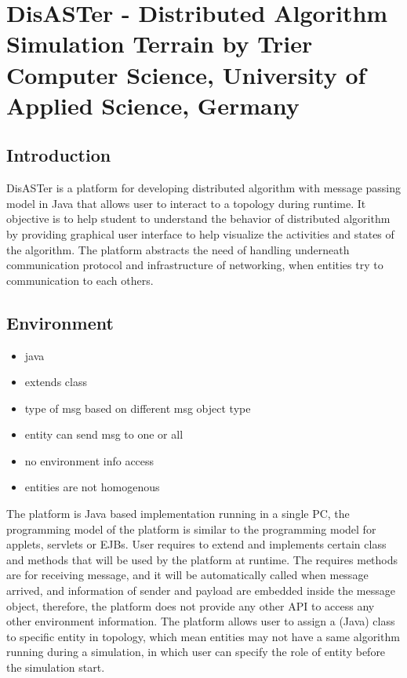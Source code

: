 \section{DisASTer - Distributed Algorithm Simulation Terrain by Trier Computer Science, University of Applied Science, Germany}
\subsection*{Introduction}
DisASTer is a platform for developing distributed algorithm with message passing model in Java that allows user to interact to a topology during runtime. It objective is to help student to understand the behavior of distributed algorithm by providing graphical user interface to help visualize the activities and states of the algorithm. The platform abstracts the need of handling underneath communication protocol and infrastructure of networking, when entities try to communication to each others.

\subsection*{Environment}
\begin{itemize}
\item java
\item extends class
\item type of msg based on different msg object type
\item entity can send msg to one or all
\item no environment info access
\item entities are not homogenous
\end{itemize}


The platform is Java based implementation running in a single PC, the programming model of the platform is similar to the programming model for applets, servlets or EJBs\cite{ref1}. User requires to extend and implements certain class and methods that will be used by the platform at runtime. The requires methods are for receiving message, and it will be automatically called when message arrived, and information of sender and payload are embedded inside the message object, therefore, the platform does not provide any other API to access any other environment information. The platform allows user to assign a (Java) class to specific entity in topology, which mean entities may not have a same algorithm running during a simulation, in which user can specify the role of entity before the simulation start.

